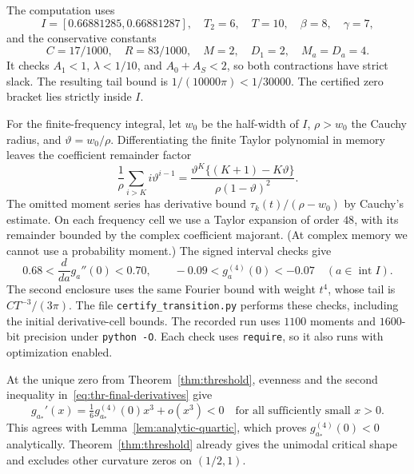 The computation uses
\[
 I=[0.66881285,0.66881287],\quad T_2=6,\quad T=10,
 \quad\beta=8,\quad\gamma=7,
\]
and the conservative constants
\[
 C=17/1000,\quad R=83/1000,\quad M=2,
 \quad D_1=2,\quad M_a=D_a=4.
\]
It checks $A_1<1$, $\lambda<1/10$, and $A_0+A_S<2$, so both
contractions have strict slack. The resulting tail bound is
$1/(10000\pi)<1/30000$.
The certified zero bracket lies strictly inside $I$.

For the finite-frequency integral, let $w_0$ be the half-width of $I$,
$\rho>w_0$ the Cauchy radius, and $\vartheta=w_0/\rho$.
Differentiating the finite Taylor polynomial in memory leaves the
coefficient remainder factor
\[
 \frac1\rho\sum_{i>K}i \vartheta^{i-1}
 =\frac{\vartheta^K\{(K+1)-K\vartheta\}}{\rho(1-\vartheta)^2}.
\]
The omitted moment series has derivative bound
$\tau_k(t)/(\rho-w_0)$ by Cauchy's estimate.
On each frequency cell we use a Taylor expansion of order $48$, with its remainder bounded by the complex coefficient majorant. (At complex memory we cannot use a probability moment.)
The signed interval checks give
\begin{equation}\label{eq:thr-final-derivatives}
 0.68<\frac{d}{da}g_a''(0)<0.70,\qquad
 -0.09<g_a^{(4)}(0)<-0.07
 \quad(a\in\operatorname{int}I).
\end{equation}
The second enclosure uses the same Fourier bound with weight $t^4$, whose tail is $CT^{-3}/(3\pi)$.
The file \texttt{certify\_transition.py} performs these checks, including
the initial derivative-cell bounds. The recorded run uses $1100$ moments
and $1600$-bit precision under \texttt{python -O}.
Each check uses \texttt{require}, so it also runs with optimization enabled.

At the unique zero from Theorem~\ref{thm:threshold}, evenness
and the second inequality in~\eqref{eq:thr-final-derivatives} give
\[
 g_{a_*}'(x)=\tfrac16g_{a_*}^{(4)}(0)x^3+o(x^3)<0
 \quad\text{for all sufficiently small }x>0.
\]
This agrees with Lemma~\ref{lem:analytic-quartic}, which proves
$g_{a_*}^{(4)}(0)<0$ analytically. Theorem~\ref{thm:threshold} already gives the unimodal critical shape
and excludes other curvature zeros on $(1/2,1)$.

